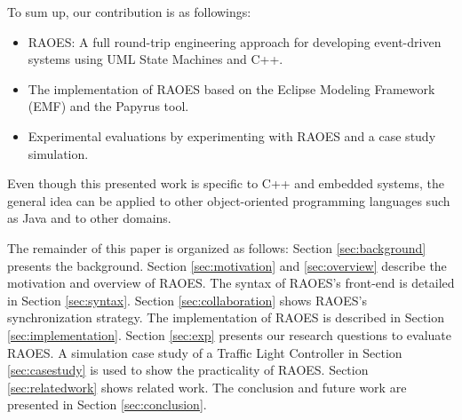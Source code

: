 To sum up, our contribution is as followings:
\begin{itemize}
	\item RAOES: A full round-trip engineering approach for developing event-driven systems using UML State Machines and C++.
	\item The implementation of RAOES based on the Eclipse Modeling Framework (EMF) and the Papyrus tool.
	\item Experimental evaluations by experimenting with RAOES and a case study simulation.
\end{itemize}

Even though this presented work is specific to C++ and embedded systems, the general idea can be applied to other object-oriented programming languages such as Java and to other domains.

The remainder of this paper is organized as follows: Section \ref{sec:background} presents the background. 
Section \ref{sec:motivation} and \ref{sec:overview} describe the motivation and overview of RAOES. 
The syntax of RAOES's front-end is detailed in Section \ref{sec:syntax}.
Section \ref{sec:collaboration} shows RAOES's synchronization strategy.
The implementation of RAOES is described in Section \ref{sec:implementation}. 
Section \ref{sec:exp} presents our research questions to evaluate RAOES. 
A simulation case study of a Traffic Light Controller in Section \ref{sec:casestudy} is used to show the practicality of RAOES.  
Section \ref{sec:relatedwork} shows related work. 
The conclusion and future work are presented in Section \ref{sec:conclusion}.

